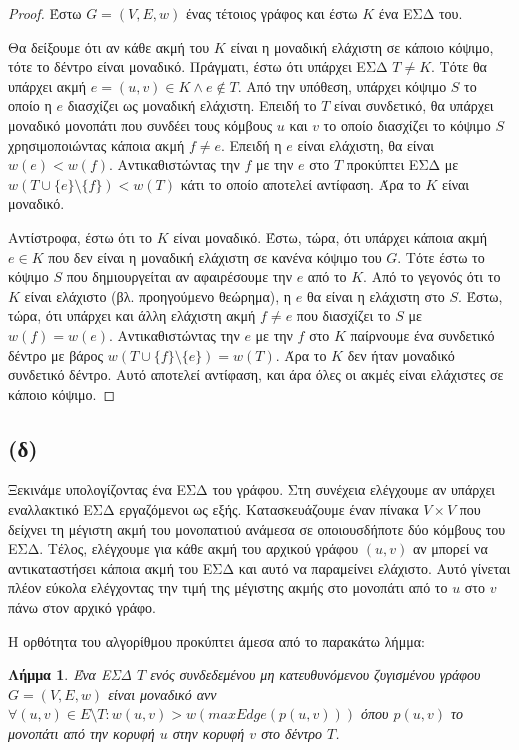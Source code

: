 \documentclass[11pt,a4paper,oneside]{report}
\newtheorem*{lemma}{Λήμμα}
\begin{document}
\begin{proof}
Έστω $G = (V, E, w)$ ένας τέτοιος γράφος και έστω $K$ ένα ΕΣΔ του.

Θα δείξουμε ότι αν κάθε ακμή του $K$ είναι η μοναδική ελάχιστη σε κάποιο κόψιμο, τότε το δέντρο είναι μοναδικό. Πράγματι, έστω ότι υπάρχει ΕΣΔ $T \neq K$. Τότε θα υπάρχει ακμή $e = (u, v) \in K \land e \not\in T$. Από την υπόθεση, υπάρχει κόψιμο $S$ το οποίο η $e$ διασχίζει ως μοναδική ελάχιστη. Επειδή το $T$ είναι συνδετικό, θα υπάρχει μοναδικό μονοπάτι που συνδέει τους κόμβους $u$ και $v$ το οποίο διασχίζει το κόψιμο $S$ χρησιμοποιώντας κάποια ακμή $f \neq e$. Επειδή η $e$ είναι ελάχιστη, θα είναι $w(e) < w(f)$. Αντικαθιστώντας την $f$ με την $e$ στο $T$ προκύπτει ΕΣΔ με $w( T \cup \{ e \} \setminus \{ f \} ) < w( T )$ κάτι το οποίο αποτελεί αντίφαση. Άρα το $K$ είναι μοναδικό.

Αντίστροφα, έστω ότι το $K$ είναι μοναδικό. Έστω, τώρα, ότι υπάρχει κάποια ακμή $e \in K$ που δεν είναι η μοναδική ελάχιστη σε κανένα κόψιμο του $G$. Τότε έστω το κόψιμο $S$ που δημιουργείται αν αφαιρέσουμε την $e$ από το $K$. Από το γεγονός ότι το $K$ είναι ελάχιστο (βλ. προηγούμενο θεώρημα), η $e$ θα είναι η ελάχιστη στο $S$. Έστω, τώρα, ότι υπάρχει και άλλη ελάχιστη ακμή $f \neq e$ που διασχίζει το $S$ με $w( f ) = w( e )$. Αντικαθιστώντας την $e$ με την $f$ στο $K$ παίρνουμε ένα συνδετικό δέντρο με βάρος $w( T \cup \{ f \} \setminus \{ e \} ) = w( T )$. Άρα το $K$ δεν ήταν μοναδικό συνδετικό δέντρο. Αυτό αποτελεί αντίφαση, και άρα όλες οι ακμές είναι ελάχιστες σε κάποιο κόψιμο.
\end{proof}

\subsection*{(δ)}
Ξεκινάμε υπολογίζοντας ένα ΕΣΔ του γράφου. Στη συνέχεια ελέγχουμε αν υπάρχει εναλλακτικό ΕΣΔ εργαζόμενοι ως εξής. Κατασκευάζουμε έναν πίνακα $V \times V$ που δείχνει τη μέγιστη ακμή του μονοπατιού ανάμεσα σε οποιουσδήποτε δύο κόμβους του ΕΣΔ. Τέλος, ελέγχουμε για κάθε ακμή του αρχικού γράφου $(u, v)$ αν μπορεί να αντικαταστήσει κάποια ακμή του ΕΣΔ και αυτό να παραμείνει ελάχιστο. Αυτό γίνεται πλέον εύκολα ελέγχοντας την τιμή της μέγιστης ακμής στο μονοπάτι από το $u$ στο $v$ πάνω στον αρχικό γράφο.

Η ορθότητα του αλγορίθμου προκύπτει άμεσα από το παρακάτω λήμμα:

\begin{lemma}
Ένα ΕΣΔ $T$ ενός συνδεδεμένου μη κατευθυνόμενου ζυγισμένου γράφου $G = (V, E, w)$ είναι μοναδικό ανν $\forall (u, v) \in E \setminus T: w( u, v ) > w(maxEdge(p(u, v)))$ όπου $p(u, v)$ το μονοπάτι από την κορυφή $u$ στην κορυφή $v$ στο δέντρο $T$.
\end{lemma}
\end{document}
